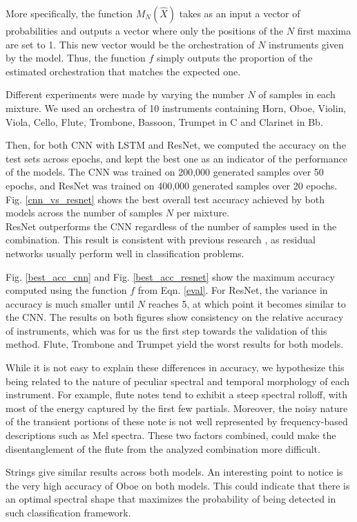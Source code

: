\documentclass{article}
\begin{document}
More specifically, the function $M_N(\hat{X})$ takes as an input a vector of probabilities and outputs a vector where only the positions of the $N$ first maxima are set to 1. This new vector would be the orchestration of $N$ instruments given by the model. Thus, the function $f$ simply outputs the proportion of the estimated orchestration that matches the expected one.

Different experiments were made by varying the number $N$ of samples in each mixture. We used an orchestra of 10 instruments containing Horn, Oboe, Violin, Viola, Cello, Flute, Trombone, Bassoon, Trumpet in C and Clarinet in Bb.

Then, for both CNN with LSTM and ResNet, we computed the accuracy on the test sets across epochs, and kept the best one as an indicator of the performance of the models. 
The CNN was trained on 200,000 generated samples over 50 epochs, and ResNet was trained on 400,000 generated samples over 20 epochs. Fig. \ref{cnn_vs_resnet} shows the best overall test accuracy achieved by both models across the number of samples $N$ per mixture.\\

ResNet outperforms the CNN regardless of the number of samples used in the combination. This result is consistent with previous research \cite{He15}, as residual networks usually perform well in classification problems.

Fig. \ref{best_acc_cnn} and Fig. \ref{best_acc_resnet} show the maximum accuracy computed using the function $f$ from Eqn. \eqref{eval}. For ResNet, the variance in accuracy is much smaller until $N$ reaches 5, at which point it becomes similar to the CNN. The results on both figures show consistency on the relative accuracy of instruments, which was for us the first step towards the validation of this method. Flute, Trombone and Trumpet yield the worst results for both models. 

While it is not easy to explain these differences in accuracy, we hypothesize this being related to the nature of peculiar spectral and temporal morphology of each instrument. For example, flute notes tend to exhibit a steep spectral rolloff, with most of the energy captured by the first few partials. Moreover, the noisy nature of the transient portions of these note is not well represented by frequency-based descriptions such as Mel spectra. These two factors combined, could make the disentanglement of the flute from the analyzed combination more difficult.

Strings give similar results across both models. An interesting point to notice is the very high accuracy of Oboe on both models. This could indicate that there is an optimal spectral shape that maximizes the probability of being detected in such classification framework.
\end{document}
